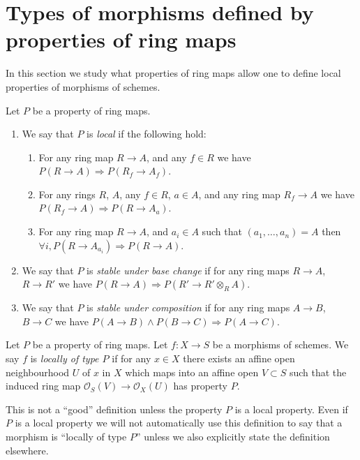 \section{Types of morphisms defined by properties of ring maps}
\label{section-properties-ring-maps}

\noindent
In this section we study what properties of ring maps
allow one to define local properties of morphisms of schemes.

\begin{definition}
\label{definition-property-local}
Let $P$ be a property of ring maps.
\begin{enumerate}
\item We say that $P$ is {\it local} if the following hold:
\begin{enumerate}
\item For any ring map $R \to A$, and any $f \in R$ we have
$P(R \to A) \Rightarrow P(R_f \to A_f)$.
\item For any rings $R$, $A$, any $f \in R$, $a\in A$, and any ring map
$R_f \to A$ we have $P(R_f \to A) \Rightarrow P(R \to A_a)$.
\item For any ring map $R \to A$, and $a_i \in A$ such that
$(a_1, \ldots, a_n) = A$ then
$\forall i, P(R \to A_{a_i}) \Rightarrow P(R \to A)$.
\end{enumerate}
\item We say that $P$ is {\it stable under base change} if for any
ring maps $R \to A$, $R \to R'$ we have
$P(R \to A) \Rightarrow P(R' \to R' \otimes_R A)$.
\item We say that $P$ is {\it stable under composition} if for any
ring maps $A \to B$, $B \to C$ we have
$P(A \to B) \wedge P(B \to C) \Rightarrow P(A \to C)$.
\end{enumerate}
\end{definition}

\begin{definition}
\label{definition-locally-P}
Let $P$ be a property of ring maps.
Let $f : X \to S$ be a morphisms of schemes.
We say $f$ is {\it locally of type $P$} if for any $x \in X$
there exists an affine open neighbourhood $U$ of $x$
in $X$ which maps into an affine open $V \subset S$ such that
the induced ring map $\mathcal{O}_S(V) \to \mathcal{O}_X(U)$
has property $P$.
\end{definition}

\noindent
This is not a ``good'' definition unless the property $P$ is
a local property. Even if $P$ is a local property we will not
automatically use this definition to say that a morphism is
``locally of type $P$'' unless we also explicitly state the
definition elsewhere.

